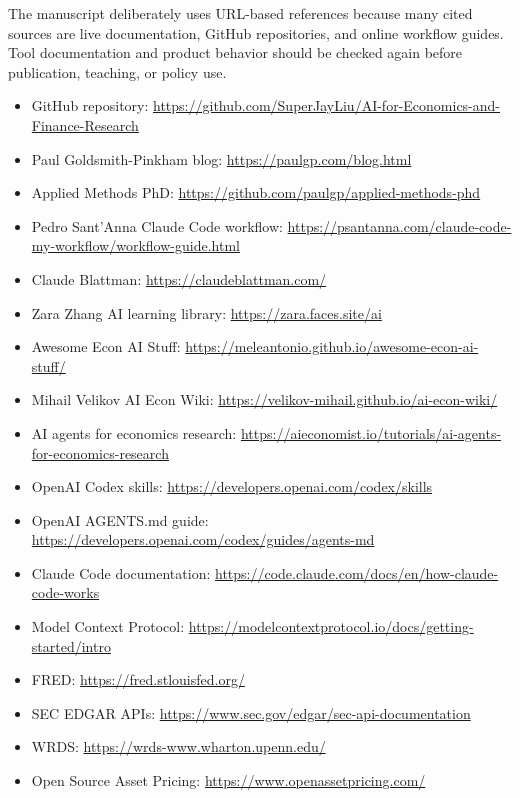 \documentclass[11pt]{article}
\begin{document}
The manuscript deliberately uses URL-based references because many cited sources are live documentation, GitHub repositories, and online workflow guides. Tool documentation and product behavior should be checked again before publication, teaching, or policy use.

\begin{itemize}[leftmargin=2em]
  \item GitHub repository: \url{https://github.com/SuperJayLiu/AI-for-Economics-and-Finance-Research}
  \item Paul Goldsmith-Pinkham blog: \url{https://paulgp.com/blog.html}
  \item Applied Methods PhD: \url{https://github.com/paulgp/applied-methods-phd}
  \item Pedro Sant'Anna Claude Code workflow: \url{https://psantanna.com/claude-code-my-workflow/workflow-guide.html}
  \item Claude Blattman: \url{https://claudeblattman.com/}
  \item Zara Zhang AI learning library: \url{https://zara.faces.site/ai}
  \item Awesome Econ AI Stuff: \url{https://meleantonio.github.io/awesome-econ-ai-stuff/}
  \item Mihail Velikov AI Econ Wiki: \url{https://velikov-mihail.github.io/ai-econ-wiki/}
  \item AI agents for economics research: \url{https://aieconomist.io/tutorials/ai-agents-for-economics-research}
  \item OpenAI Codex skills: \url{https://developers.openai.com/codex/skills}
  \item OpenAI AGENTS.md guide: \url{https://developers.openai.com/codex/guides/agents-md}
  \item Claude Code documentation: \url{https://code.claude.com/docs/en/how-claude-code-works}
  \item Model Context Protocol: \url{https://modelcontextprotocol.io/docs/getting-started/intro}
  \item FRED: \url{https://fred.stlouisfed.org/}
  \item SEC EDGAR APIs: \url{https://www.sec.gov/edgar/sec-api-documentation}
  \item WRDS: \url{https://wrds-www.wharton.upenn.edu/}
  \item Open Source Asset Pricing: \url{https://www.openassetpricing.com/}
\end{itemize}
\end{document}
